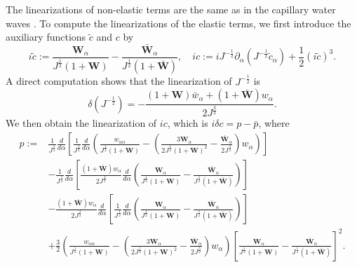 \documentclass[10pt]{amsart}
\theoremstyle{remark}
\theoremstyle{definition}
\numberwithin{equation}{section}
\newcommand{\p}{\partial}
\newcommand{\al}{\alpha}
\newcommand{\f}{\frac}
\begin{document}
The linearizations of non-elastic terms are the same as in the capillary water waves \cite{MR3667289}.
To compute the linearizations of the elastic terms, we first introduce the auxiliary functions $\tilde{c}$ and $c$ by
\begin{equation*}
i\tilde{c}:=\f{\mathbf{W}_{\al}}{J^{\f12}(1+\mathbf{W})}
-\f{\bar{\mathbf{W}}_{\al}}{J^{\f12}(1+\bar{\mathbf{W}})}, \quad
ic:=iJ^{-\f12} \p_\al(J^{-\f12}\tilde{c}_\al)+\f12(i\tilde{c})^3.
\end{equation*}
A direct computation shows that the linearization of $J^{-\f12}$ is
\begin{equation*}
\delta(J^{-\f12})=-\frac{(1+\mathbf{W})\bar{w}_{\al}+(1+\bar{\mathbf{W}})w_{\al}}{2J^{\f32}}.
\end{equation*}
We then obtain the linearization of $ic$, which is $ i\delta c=p-\bar{p}$, where
\begin{align*}
p:=&\f{1}{J^{\f12}}\f{d}{d\al}\left[\f{1}{J^{\f12}}\f{d}{d\al}\left(\f{w_{\al\al}}{J^{\f12}(1+\mathbf{W})}-\left(\f{3\mathbf{W}_{\al}}{2J^{\f12}(1+\mathbf{W})^2}-\f{\bar{\mathbf{W}}_{\al}}{2J^{\f32}}\right)w_{\al}\right)\right]\\
&-\f{1}{J^{\f12}}\f{d}{d\al}\left[\frac{(1+\bar{\mathbf{W}})w_{\al}}{2J^{\f32}}\f{d}{d\al}\left(\f{\mathbf{W}_{\al}}{J^{\f12}(1+\mathbf{W})}-\f{\bar{\mathbf{W}}_{\al}}{J^{\f12}(1+\bar{\mathbf{W}})}
\right)\right]\\
&-\frac{(1+\bar{\mathbf{W}})w_{\al}}{2J^{\f32}}\f{d}{d\al}\left[\f{1}{J^{\f12}}\f{d}{d\al}\left(\f{\mathbf{W}_{\al}}{J^{\f12}(1+\mathbf{W})}-\f{\bar{\mathbf{W}}_{\al}}{J^{\f12}(1+\bar{\mathbf{W}})}
\right)\right]\\
&+\f32\left(\f{w_{\al\al}}{J^{\f12}(1+\mathbf{W})}-\left(\f{3\mathbf{W}_{\al}}{2J^{\f12}(1+\mathbf{W})^2}-\f{\bar{\mathbf{W}}_{\al}}{2J^{\f32}}\right)w_{\al}\right)\left[\f{\mathbf{W}_{\al}}{J^{\f12}(1+\mathbf{W})}
-\f{\bar{\mathbf{W}}_{\al}}{J^{\f12}(1+\bar{\mathbf{W}})}\right]^2.
\end{align*}
\end{document}
